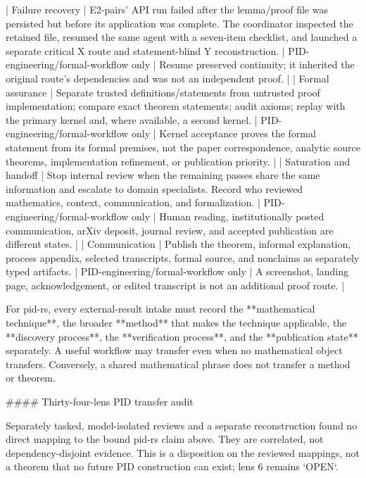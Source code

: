 \documentclass[11pt]{article}
\begin{document}
\begin{markdown}
| Failure recovery | E2-pairs' API run failed after the lemma/proof file was persisted but before its application was complete. The coordinator inspected the retained file, resumed the same agent with a seven-item checklist, and launched a separate critical X route and statement-blind Y reconstruction. | PID-engineering/formal-workflow only | Resume preserved continuity; it inherited the original route's dependencies and was not an independent proof. |
| Formal assurance | Separate trusted definitions/statements from untrusted proof implementation; compare exact theorem statements; audit axioms; replay with the primary kernel and, where available, a second kernel. | PID-engineering/formal-workflow only | Kernel acceptance proves the formal statement from its formal premises, not the paper correspondence, analytic source theorems, implementation refinement, or publication priority. |
| Saturation and handoff | Stop internal review when the remaining passes share the same information and escalate to domain specialists. Record who reviewed mathematics, context, communication, and formalization. | PID-engineering/formal-workflow only | Human reading, institutionally posted communication, arXiv deposit, journal review, and accepted publication are different states. |
| Communication | Publish the theorem, informal explanation, process appendix, selected transcripts, formal source, and nonclaims as separately typed artifacts. | PID-engineering/formal-workflow only | A screenshot, landing page, acknowledgement, or edited transcript is not an additional proof route. |

For pid-rs, every external-result intake must record the **mathematical technique**, the broader
**method** that makes the technique applicable, the **discovery process**, the **verification
process**, and the **publication state** separately. A useful workflow may transfer even when no
mathematical object transfers. Conversely, a shared mathematical phrase does not transfer a
method or theorem.

#### Thirty-four-lens PID transfer audit

Separately tasked, model-isolated reviews and a separate reconstruction found no direct mapping to
the bound pid-rs claim above. They are correlated, not dependency-disjoint evidence. This is a
disposition on the reviewed mappings, not a theorem that no future PID construction can exist;
lens 6 remains `OPEN`.


\end{markdown}
\end{document}
